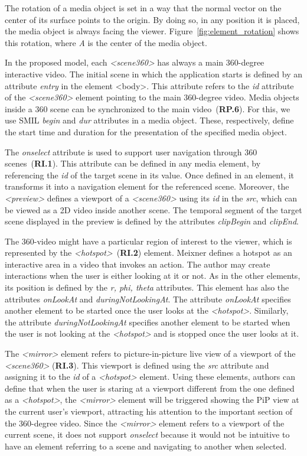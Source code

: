 The rotation of a media object is set in a way that the normal vector on the center of its surface points to the origin. By doing so, in any position it is placed, the media object is always facing the viewer. Figure~\ref{fig:element_rotation} shows this rotation, where \emph{A} is the center of the media object.

In the proposed model, each \emph{<scene360>} has always a main 360-degree interactive video. The initial scene in which the application starts is defined by an attribute \emph{entry} in the element <body>. This attribute refers to the \emph{id} attribute of the \emph{<scene360>} element pointing to the main 360-degree video. Media objects inside a 360 scene can be synchronized to the main video~(\textbf{RP.6}). For this, we use SMIL \emph{begin} and \emph{dur} attributes in a media object. These, respectively, define the start time and duration for the presentation of the specified media object.

The \emph{onselect} attribute is used to support user navigation through 360 scenes~(\textbf{RI.1}). This attribute can be defined in any media element, by referencing the \emph{id} of the target scene in its value. Once defined in an element, it transforms it into a navigation element for the referenced scene. Moreover, the \emph{<preview>} defines a viewport of a \emph{<scene360>} using its \emph{id} in the \emph{src}, which can be viewed as a 2D video inside another scene. The temporal segment of the target scene displayed in the preview is defined by the attributes \emph{clipBegin} and \emph{clipEnd}. 

The 360-video might have a particular region of interest to the viewer, which is represented by the \emph{<hotspot>}~(\textbf{RI.2}) element. Meixner \cite{Britta2017} defines a hotspot as an interactive area in a video that invokes an action. The author may create interactions when the user is either looking at it or not. As in the other elements, its position is defined by the \emph{r, phi, theta} attributes. This element has also the attributes \emph{onLookAt} and \emph{duringNotLookingAt}. The attribute \emph{onLookAt} specifies another element to be started once the user looks at the \emph{<hotspot>}. Similarly, the attribute \emph{duringNotLookingAt} specifies another element to be started when the user is not looking at the \emph{<hotspot>} and is stopped once the user looks at it.

The \emph{<mirror>} element refers to picture-in-picture live view of a viewport of the \emph{<scene360>} (\textbf{RI.3}). This viewport is defined using the \emph{src} attribute and assigning it to the \emph{id} of a \emph{<hotspot>} element. Using these elements, authors can define that when the user is staring at a viewport different from the one defined as a \emph{<hotspot>}, the \emph{<mirror>} element will be triggered showing the PiP view at the current user's viewport, attracting his attention to the important section of the 360-degree video. Since the \emph{<mirror>} element refers to a viewport of the current scene, it does not support \emph{onselect} because it would not be intuitive to have an element referring to a scene and navigating to another when selected.


